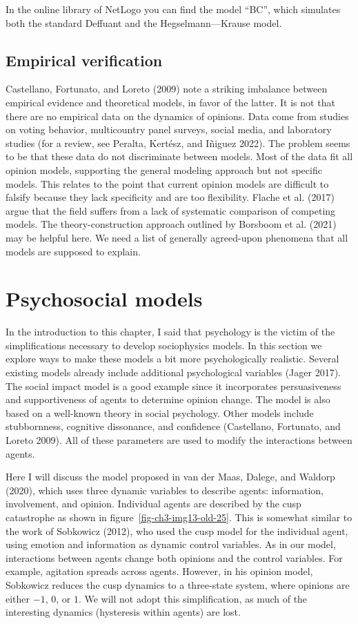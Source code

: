 \documentclass[
  a4paper,
  DIV=11,
  numbers=noendperiod,
  oneside]{scrreprt}
\begin{document}
In the online library of NetLogo you can find the model ``BC'', which
simulates both the standard Deffuant and the Hegselmann---Krause model.

\subsection{Empirical verification}\label{sec-Empirical-verification}

Castellano, Fortunato, and Loreto (2009) note a striking imbalance
between empirical evidence and theoretical models, in favor of the
latter. It is not that there are no empirical data on the dynamics of
opinions. Data come from studies on voting behavior, multicountry panel
surveys, social media, and laboratory studies (for a review, see
Peralta, Kertész, and Iñiguez 2022). The problem seems to be that these
data do not discriminate between models. Most of the data fit all
opinion models, supporting the general modeling approach but not
specific models. This relates to the point that current opinion models
are difficult to falsify because they lack specificity and are too
flexibility. Flache et al. (2017) argue that the field suffers from a
lack of systematic comparison of competing models. The
theory-construction approach outlined by Borsboom et al. (2021) may be
helpful here. We need a list of generally agreed-upon phenomena that all
models are supposed to explain.

\section{Psychosocial models}\label{sec-Psychosocial-models}

In the introduction to this chapter, I said that psychology is the
victim of the simplifications necessary to develop sociophysics models.
In this section we explore ways to make these models a bit more
psychologically realistic. Several existing models already include
additional psychological variables (Jager 2017). The social impact model
is a good example since it incorporates persuasiveness and
supportiveness of agents to determine opinion change. The model is also
based on a well-known theory in social psychology. Other models include
stubbornness, cognitive dissonance, and confidence (Castellano,
Fortunato, and Loreto 2009). All of these parameters are used to modify
the interactions between agents.

Here I will discuss the model proposed in van der Maas, Dalege, and
Waldorp (2020), which uses three dynamic variables to describe agents:
information, involvement, and opinion. Individual agents are described
by the cusp catastrophe as shown in figure~\ref{fig-ch3-img13-old-25}.
This is somewhat similar to the work of Sobkowicz (2012), who used the
cusp model for the individual agent, using emotion and information as
dynamic control variables. As in our model, interactions between agents
change both opinions and the control variables. For example, agitation
spreads across agents. However, in his opinion model, Sobkowicz reduces
the cusp dynamics to a three-state system, where opinions are either
\(-1\), \(0\), or \(1\). We will not adopt this simplification, as much
of the interesting dynamics (hysteresis within agents) are lost.
\end{document}
